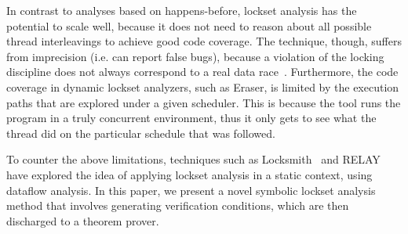 In contrast to analyses based on happens-before, lockset analysis has the potential to scale well, because it does not need to reason about all possible thread interleavings to achieve good code coverage. The technique, though, suffers from imprecision (i.e. can report false bugs), because a violation of the locking discipline does not always correspond to a real data race~\cite{savage1997eraser, pozniansky2003efficient, o2003hybrid, elmas2007goldilocks, flanagan2009fasttrack}. Furthermore, the code coverage in dynamic lockset analyzers, such as Eraser, is limited by the execution paths that are explored under a given scheduler. This is because the tool runs the program in a truly concurrent environment, thus it only gets to see what the thread did on the particular schedule that was followed.

To counter the above limitations, techniques such as Locksmith~\cite{pratikakis2006locksmith} and RELAY~\cite{voung2007relay} have explored the idea of applying lockset analysis in a static context, using dataflow analysis. In this paper, we present a novel symbolic lockset analysis method that involves generating verification conditions, which are then discharged to a theorem prover.
